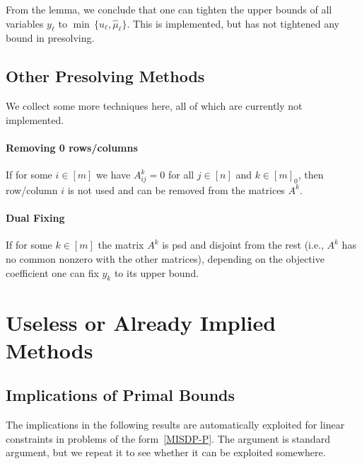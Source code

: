 \documentclass[10pt, a4paper]{article}
\begin{document}
From the lemma, we conclude that one can tighten the upper bounds of all
variables $y_{\ell}$ to $\min\, \{u_{\ell}, \hat{\mu}_{\ell}\}$. This is
implemented, but has not tightened any bound in presolving.



\subsection{Other Presolving Methods}

We collect some more techniques here, all of which are currently not implemented.

\paragraph{Removing 0 rows/columns}

If for some $i \in [m]$ we have $A_{ij}^k = 0$ for all $j \in [n]$ and
$k \in [m]_0$, then row/column $i$ is not used and can be removed from the
matrices $A^k$.

\paragraph{Dual Fixing}

If for some $k \in [m]$ the matrix $A^k$ is psd and disjoint from the rest
(i.e., $A^k$ has no common nonzero with the other matrices), depending on
the objective coefficient one can fix $y_k$ to its upper bound.


\section{Useless or Already Implied Methods}


\subsection{Implications of Primal Bounds}

The implications in the following results are automatically exploited for
linear constraints in problems of the form~\eqref{MISDP-P}. The argument
is standard argument, but we repeat it to see whether it can be exploited
somewhere.
\end{document}
